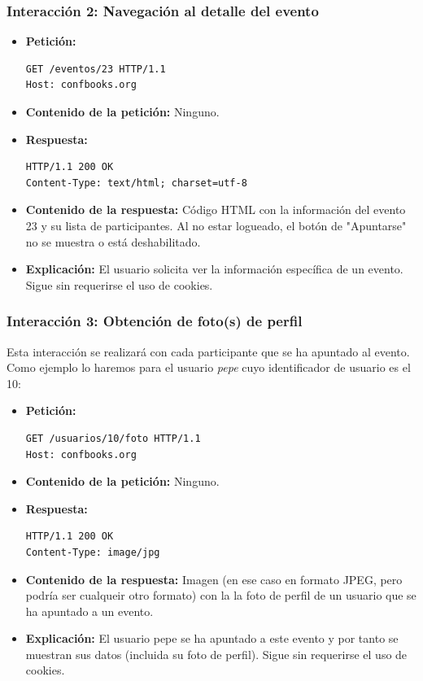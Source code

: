 \subsubsection*{Interacción 2: Navegación al detalle del evento}
\begin{itemize}
    \item \textbf{Petición:}
    \begin{verbatim}
GET /eventos/23 HTTP/1.1
Host: confbooks.org
    \end{verbatim}
    \item \textbf{Contenido de la petición:} Ninguno.
    \item \textbf{Respuesta:}
    \begin{verbatim}
HTTP/1.1 200 OK
Content-Type: text/html; charset=utf-8
    \end{verbatim}
    \item \textbf{Contenido de la respuesta:} Código HTML con la información del evento 23 y su lista de participantes. Al no estar logueado, el botón de "Apuntarse" no se muestra o está deshabilitado.
    \item \textbf{Explicación:} El usuario solicita ver la información específica de un evento. Sigue sin requerirse el uso de cookies.
\end{itemize}

\subsubsection*{Interacción 3: Obtención de foto(s) de perfil}

Esta interacción se realizará con cada participante que se ha apuntado al evento. Como ejemplo lo haremos para el usuario \emph{pepe} cuyo identificador de usuario es el 10:

\begin{itemize}
    \item \textbf{Petición:}
    \begin{verbatim}
GET /usuarios/10/foto HTTP/1.1
Host: confbooks.org
    \end{verbatim}
    \item \textbf{Contenido de la petición:} Ninguno.
    \item \textbf{Respuesta:}
    \begin{verbatim}
HTTP/1.1 200 OK
Content-Type: image/jpg
    \end{verbatim}
    \item \textbf{Contenido de la respuesta:} Imagen (en ese caso en formato JPEG, pero podría ser cualqueir otro formato) con la la foto de perfil de un usuario que se ha apuntado a un evento.
    \item \textbf{Explicación:} El usuario pepe se ha apuntado a este evento y por tanto se muestran sus datos (incluida su foto de perfil). Sigue sin requerirse el uso de cookies.
\end{itemize}

